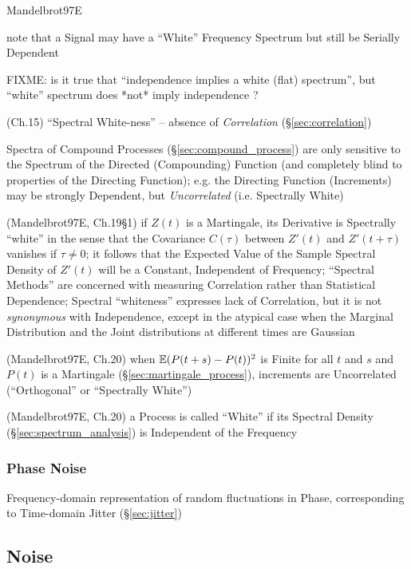Mandelbrot97E

note that a Signal may have a ``White'' Frequency Spectrum but still be Serially
Dependent

FIXME: is it true that ``independence implies a white (flat) spectrum'',
but ``white'' spectrum does *not* imply independence ?

(Ch.15) ``Spectral White-ness'' -- absence of \emph{Correlation}
(\S\ref{sec:correlation})

Spectra of Compound Processes (\S\ref{sec:compound_process}) are only sensitive
to the Spectrum of the Directed (Compounding) Function (and completely blind to
properties of the Directing Function); e.g. the Directing Function (Increments)
may be strongly Dependent, but \emph{Uncorrelated} (i.e. Spectrally White)

(Mandelbrot97E, Ch.19\S 1) if $Z(t)$ is a Martingale, its Derivative is
Spectrally ``white'' in the sense that the Covariance $C(\tau)$ between $Z'(t)$
and $Z'(t + \tau)$ vanishes if $\tau \neq 0$; it follows that the Expected Value
of the Sample Spectral Density of $Z'(t)$ will be a Constant, Independent of
Frequency; ``Spectral Methods'' are concerned with measuring Correlation rather
than Statistical Dependence; Spectral ``whiteness'' expresses lack of
Correlation, but it is not \emph{synonymous} with Independence, except in the
atypical case when the Marginal Distribution and the Joint distributions at
different times are Gaussian

(Mandelbrot97E, Ch.20) when $\mathbb{E}(P(t+s) - P(t))^2$ is Finite for all $t$ and
$s$ and $P(t)$ is a Martingale (\S\ref{sec:martingale_process}), increments are
Uncorrelated (``Orthogonal'' or ``Spectrally White'')

(Mandelbrot97E, Ch.20) a Process is called ``White'' if its Spectral Density
(\S\ref{sec:spectrum_analysis}) is Independent of the Frequency



\subsubsection{Phase Noise}\label{sec:phase_noise}

Frequency-domain representation of random fluctuations in Phase, corresponding
to Time-domain Jitter (\S\ref{sec:jitter})



\subsection{Noise}\label{sec:noise}

